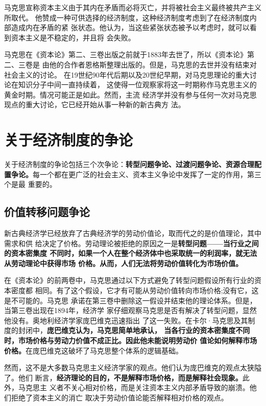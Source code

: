 马克思宣称资本主义由于其内在矛盾而必将灭亡，并将被社会主义最终被共产主义所取代。
他赞成一种可供选择的经济制度，这种经济制度考虑到了在经济制度内部造成内在矛盾的紧
张状态。他认为，当这些紧张状态被予以考虑时，就可以看到资本主义是不稳定的，并且将
会失败。

马克思在《资本论》第二、三卷出版之前就于1883年去世了，所以《资本论》第二、三卷是
由他的合作者恩格斯整理出版的。但是，马克思的去世并没有结束对社会主义的讨论。
在19世纪90年代后期以及20世纪早期，对马克思理论的重大讨论在知识分子中间一直持续着，
这使得一位观察家将这一时期称作马克思主义的黄金时期。情况可能正是如此。然而，主流
经济学并没有参与任何一次对马克思现点的重大讨论，它已经开始从事一种新的新古典方
法。

\section{关于经济制度的争论}

关于经济制度的争论包括三个次争论：\textbf{转型问题争论、过渡问题争论、资源合理配
  置争论。}每一个都在更广泛的社会主义、资本主义争论中发挥了一定的作用，第三个是最
重要的。

\subsection{价值转移问题争论}

新古典经济学已经放弃了古典经济学的劳动价值论，取而代之的是价值理论，其中需求和供
给决定了价格。劳动理论被拒绝的原因之一是\textbf{转型问题——当行业之间的资本密集度
  不同时，如果一个人在整个经济体中也采取统一的利润率，就无法从劳动理论中获得市场
  价格。从而，人们无法将劳动价值转化为市场价值。}

在《资本论》的前两卷中，马克思通过以下方式避免了转型问题假设所有行业的资本密度都
相同。有了这个假设，它才有可能从劳动价值转向市场价格;没有它，这是不可能的。马克思
承诺在第三卷中删除这一假设并结束他的理论体系。但是，当第三卷出现在1894年，经济学
家仔细观察马克思是否有解决了转型问题，显然他没有。奥地利经济学家庞巴维克迅速指出
了这一失败。在卡尔·马克思及其制度的封闭中，\textbf{庞巴维克认为，马克思简单地承认，
  当各行业的资本密集度不同时，市场价格与劳动力价值不成正比。因此他未能说明劳动价
  值论如何解释市场价格。}在庞巴维克这破坏了马克思整个体系的逻辑基础。

然而，这不是大多数马克思主义经济学家的观点。他们认为庞巴维克的观点太狭隘了。他们
断言，\textbf{经济理论的目的，不是解释市场价格，而是解释社会现象。}此外，马克思主
义者不关心相对价格，而是关注资本主义内部矛盾导致的崩溃。他们拒绝了资本主义的消亡
取决于劳动价值论能否解释相对价格的观点。

